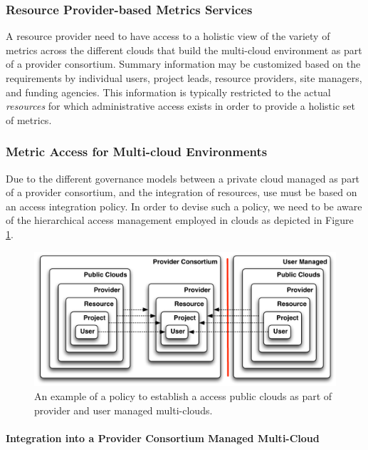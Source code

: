 \documentclass{tex/sig-alternate-2013}
\begin{document}
\subsubsection{Resource Provider-based Metrics Services} \label{S:resource-metric}

A resource provider need to have access to a holistic view of the variety of metrics across the different clouds that build the multi-cloud environment as part of a provider consortium.  Summary information may be customized based on the requirements by individual users, project leads, resource providers, site managers, and funding agencies. This information is typically restricted to the actual {\em resources} for which administrative access exists in order to provide a holistic set of metrics.

\subsubsection{Metric Access for Multi-cloud Environments} 

Due to the different governance models between a private cloud managed as part of a provider consortium, and the integration of resources, use must be based on an access integration policy. In order to devise such a policy, we need to be aware of the hierarchical access management employed in clouds as depicted in Figure \ref{F:metric-hierarchy}.

\begin{figure}[htb]
  \centering
    \includegraphics[width=1.0\columnwidth]{images/metric-hierarchy.pdf}
  \caption{An example of a policy to establish a access public clouds as part of 
    provider and user managed multi-clouds.}
  \label{F:metric-hierarchy}
\end{figure}


\paragraph{Integration into a Provider Consortium Managed Multi-Cloud}
\end{document}
